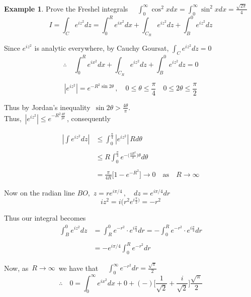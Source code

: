 \documentclass[11pt,a4paper]{article}
\theoremstyle{definition}
\newtheorem{example}[thm]{Example}
\begin{document}
\begin{example}
Prove the Freshel integrals $\quad \displaystyle{\int_0^{\infty} \cos^2x dx = \int_0^{\infty} \sin^2x dx = \frac{\sqrt{2\pi}}{4}}$\\

$$I  = \int_C e^{iz^2}dz  = \int^R_0 e^{ix^2}dx + \int_{C_R} e^{iz^2}dz + \int^0_B e^{iz^2}dz$$

Since $e^{iz^2}$ is analytic everywhere, by Cauchy Goursat, $\displaystyle{\int_C e^{iz^2}dz = 0}$\\

$$ \therefore\quad  \int^R_0 e^{ix^2}dx + \int_{C_R} e^{iz^2}dz + \int^0_B e^{iz^2}dz = 0$$



$$\left|e^{iz^2}\right| = e^{-R^2\sin 2\theta}\, , \quad  0\leq \theta \leq \frac{\pi}{4}\quad  0\leq 2\theta \leq \frac{\pi}{2}$$

Thus by Jordan's inequality  $\, \sin 2\theta > \frac{4\theta}{\pi}$.\\

Thus, $\,\left|e^{iz^2}\right| \leq \displaystyle{e^{-R^2 \frac{4\theta}{pi}}}\,$, consequently

\begin{align*}
\left|\displaystyle{\int e^{iz^2} dz}\right| & \leq \int^{\frac{\pi}{4}}_0 \left|e^{iz^2}\right|\,Rd\theta\\\\
& \leq R \int^{\frac{\pi}{4}}_0 e^{-\Big(\frac{4R^2}{\pi}\Big)\theta} d\theta\\\\
& = \frac{\pi}{4R}\Big[ 1 - e^{-R^2}\Big] \longrightarrow 0\quad  \text{as}\quad  R\longrightarrow \infty
\end{align*}

Now on the radian line $BO$, $\, z = re^{i\pi/4}\,, \quad  dz = e^{i\pi/4}dr$
$$iz^2 = i\Big(r^2 e^{i\frac{\pi}{2}\Big)} = -r^2$$

Thus our integral becomes 
\begin{align*}
\int^0_Be^{iz^2}dz & = \int^0_Re^{-r^2}\cdot e^{i\frac{\pi}{4}}dr = -\int^R_0e^{-r^2}\cdot e^{i\frac{\pi}{4}}dr\\\\
& = -e^{i\pi/4} \int^R_0 e^{-r^2}dr
\end{align*}

Now, as $\, R \longrightarrow \infty\,$ we have that $\quad \displaystyle{\int^{\infty}_0 e^{-r^2}dr = \frac{\sqrt{\pi}}{2}}$\\

$$\therefore\quad  0 = \int^{\infty}_0 e^{ix^2}dx + 0 + (-)\Bigg[\frac{1}{\sqrt{2}} + \frac{i}{\sqrt{2}}\Bigg]\frac{\sqrt{\pi}}{2}$$\\



\end{example}
\end{document}
